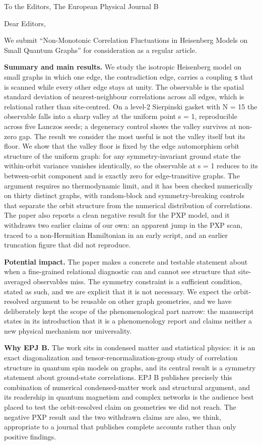 \documentclass[11pt]{article}
\begin{document}
To the Editors, The European Physical Journal B

Dear Editors,

We submit ``Non-Monotonic Correlation Fluctuations in Heisenberg Models on Small Quantum Graphs'' for consideration as a regular article.

\textbf{Summary and main results.} We study the isotropic Heisenberg model on small graphs in which one edge, the contradiction edge, carries a coupling \texttt{s} that is scanned while every other edge stays at unity. The observable is the spatial standard deviation of nearest-neighbour correlations across all edges, which is relational rather than site-centred. On a level-2 Sierpinski gasket with N = 15 the observable falls into a sharp valley at the uniform point s = 1, reproducible across five Lanczos seeds; a degeneracy control shows the valley survives at non-zero gap. The result we consider the most useful is not the valley itself but its floor. We show that the valley floor is fixed by the edge automorphism orbit structure of the uniform graph: for any symmetry-invariant ground state the within-orbit variance vanishes identically, so the observable at s = 1 reduces to its between-orbit component and is exactly zero for edge-transitive graphs. The argument requires no thermodynamic limit, and it has been checked numerically on thirty distinct graphs, with random-block and symmetry-breaking controls that separate the orbit structure from the numerical distribution of correlations. The paper also reports a clean negative result for the PXP model, and it withdraws two earlier claims of our own: an apparent jump in the PXP scan, traced to a non-Hermitian Hamiltonian in an early script, and an earlier truncation figure that did not reproduce.

\textbf{Potential impact.} The paper makes a concrete and testable statement about when a fine-grained relational diagnostic can and cannot see structure that site-averaged observables miss. The symmetry constraint is a sufficient condition, stated as such, and we are explicit that it is not necessary. We expect the orbit-resolved argument to be reusable on other graph geometries, and we have deliberately kept the scope of the phenomenological part narrow: the manuscript states in its introduction that it is a phenomenology report and claims neither a new physical mechanism nor universality.

\textbf{Why EPJ B.} The work sits in condensed matter and statistical physics: it is an exact diagonalization and tensor-renormalization-group study of correlation structure in quantum spin models on graphs, and its central result is a symmetry statement about ground-state correlations. EPJ B publishes precisely this combination of numerical condensed-matter work and structural argument, and its readership in quantum magnetism and complex networks is the audience best placed to test the orbit-resolved claim on geometries we did not reach. The negative PXP result and the two withdrawn claims are also, we think, appropriate to a journal that publishes complete accounts rather than only positive findings.
\end{document}
